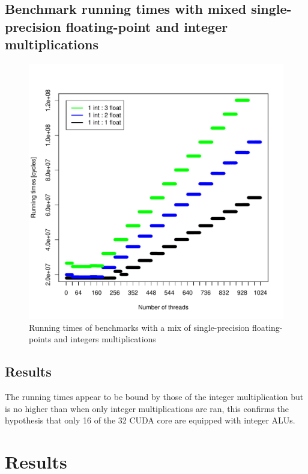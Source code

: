 \documentclass{article}
\def \scalingfactor{.8}
\begin{document}
	\subsection{Benchmark running times with mixed single-precision floating-point and integer multiplications}
	\begin{figure}[h]
		\centering
		\vspace{-20pt}
        \includegraphics[width=\scalingfactor\linewidth]{"graphics/running_times_mixed"}
		\vspace{-15pt}
        \caption{Running times of benchmarks with a mix of single-precision floating-points and integers multiplications}
    \end{figure}

    \subsection{Results}
    The running times appear to be bound by those of the integer multiplication but is no higher than
    when only integer multiplications are ran, this confirms the hypothesis that only 16 of the 32
    CUDA core are equipped with integer ALUs. 

\section{Results}
\end{document}
